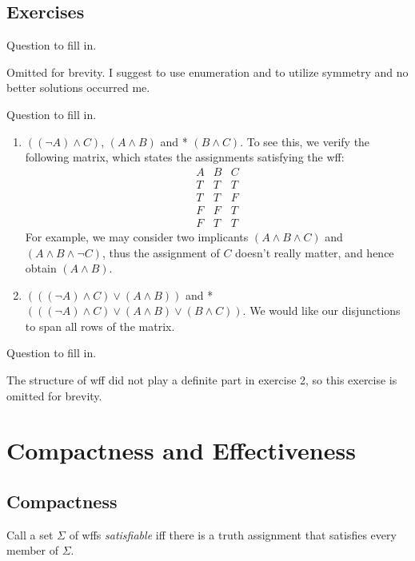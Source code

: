 \subsection*{Exercises}

\begin{exercise}
  Question to fill in.
\end{exercise}

Omitted for brevity. I suggest to use enumeration and to utilize symmetry and no better solutions occurred me.

\begin{exercise}
  Question to fill in.
\end{exercise}

\begin{enumerate}
  \item $((\neg A)\wedge C)$, $(A\wedge B)$ and * $(B\wedge C)$.
        To see this, we verify the following matrix, which states the assignments satisfying the wff:
        \[\begin{matrix}A&B&C\\ T&T&T\\ T&T&F\\ F&F&T\\ F&T&T\end{matrix}\]
        For example, we may consider two implicants $(A\wedge B\wedge C)$ and $(A\wedge B\wedge\neg C)$, thus the assignment of $C$ doesn't really matter, and hence obtain $(A\wedge B)$.
  \item $(((\neg A)\wedge C)\vee(A\wedge B))$ and * $(((\neg A)\wedge C)\vee(A\wedge B)\vee(B\wedge C))$. We would like our disjunctions to span all rows of the matrix.
\end{enumerate}

\begin{exercise}
  Question to fill in.
\end{exercise}

The structure of wff did not play a definite part in exercise 2, so this exercise is omitted for brevity.

\section{Compactness and Effectiveness}

\subsection*{Compactness}

Call a set $\Sigma$ of wffs \textit{satisfiable} iff there is a truth assignment that satisfies every member of $\Sigma$.

